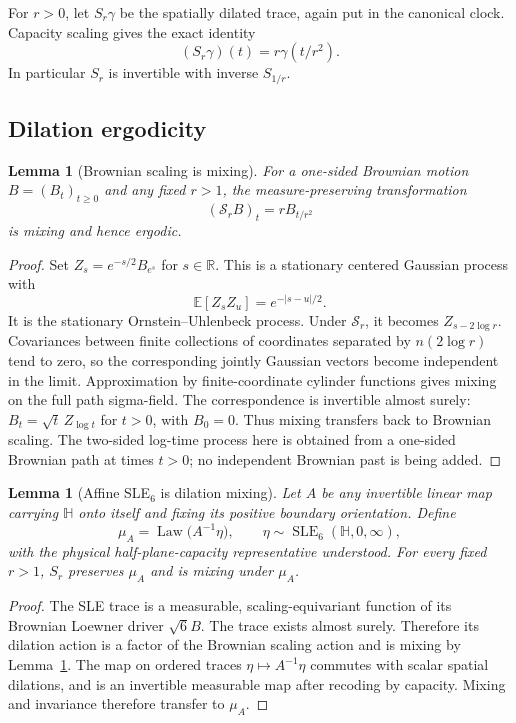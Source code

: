 \documentclass[11pt]{article}
\newtheorem{lemma}[theorem]{Lemma}
\theoremstyle{definition}\newtheorem{definition}[theorem]{Definition}
\theoremstyle{remark}\newtheorem{remark}[theorem]{Remark}
\begin{document}
For $r>0$, let $S_r\gamma$ be the spatially dilated trace, again put in the
canonical clock. Capacity scaling gives the exact identity
\[
 (S_r\gamma)(t)=r\gamma(t/r^2).
 \tag{SG1}
\]
In particular $S_r$ is invertible with inverse $S_{1/r}$.

\subsection{Dilation ergodicity}

\begin{lemma}[Brownian scaling is mixing]
\label{lem:sg-brownianmix}
For a one-sided Brownian motion $B=(B_t)_{t\geq0}$ and any fixed $r>1$, the
measure-preserving transformation
\[
 (\mathcal S_rB)_t=rB_{t/r^2}
\]
is mixing and hence ergodic.
\end{lemma}
\begin{proof}
Set $Z_s=e^{-s/2}B_{e^s}$ for $s\in\mathbb R$.
This is a stationary centered Gaussian process with
\[
 \mathbb E[Z_sZ_u]=e^{-|s-u|/2}.
\]
It is the stationary Ornstein--Uhlenbeck process. Under $\mathcal S_r$, it
becomes $Z_{s-2\log r}$. Covariances between finite collections of coordinates
separated by $n(2\log r)$ tend to zero, so the corresponding jointly Gaussian
vectors become independent in the limit. Approximation by finite-coordinate
cylinder functions gives mixing on the full path sigma-field.
The correspondence is invertible almost surely:
$B_t=\sqrt t\,Z_{\log t}$ for $t>0$, with $B_0=0$. Thus mixing transfers back
to Brownian scaling. The two-sided log-time process here is obtained from a
one-sided Brownian path at times $t>0$; no independent Brownian past is being
added.
\end{proof}

\begin{lemma}[Affine SLE$_6$ is dilation mixing]
\label{lem:sg-affinemix}
Let $A$ be any invertible linear map carrying $\mathbb H$ onto itself and
fixing its positive boundary orientation. Define
\[
 \mu_A=\operatorname{Law}\bigl(A^{-1}\eta\bigr),\qquad
 \eta\sim\operatorname{SLE}_6(\mathbb H,0,\infty),
\]
with the physical half-plane-capacity representative understood.
For every fixed $r>1$, $S_r$ preserves $\mu_A$ and is mixing under $\mu_A$.
\end{lemma}
\begin{proof}
The SLE trace is a measurable, scaling-equivariant function of its Brownian
Loewner driver $\sqrt6B$. The trace exists almost surely. Therefore its
dilation action is a factor of the Brownian scaling action and is mixing
by Lemma~\ref{lem:sg-brownianmix}. The map on ordered traces
$\eta\mapsto A^{-1}\eta$ commutes with scalar spatial dilations, and is an
invertible measurable map after recoding by capacity. Mixing and invariance
therefore transfer to $\mu_A$.
\end{proof}
\end{document}
